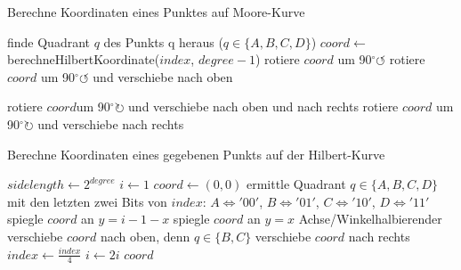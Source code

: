 \documentclass[course=erap]{aspdoc}
\begin{document}
\begin{algorithm}[h]
\scriptsize
\begin{algorithmic}
\caption{Berechne Koordinaten eines Punktes auf Moore-Kurve}
\label{moore:iterative}
	\State finde Quadrant $q$ des Punkts q heraus ($q \in \{A, B, C, D\}$)
	\State $coord \leftarrow$ berechneHilbertKoordinate($index$, $degree-1$)
	 rotiere $coord$ um 90$^{\circ} \circlearrowleft$
	 rotiere $coord$ um 90$^{\circ}\circlearrowleft$ und verschiebe nach oben
		
	 rotiere $coord$um 90$^{\circ}\circlearrowright$ und verschiebe nach oben und nach rechts
	 rotiere $coord$ um  90$^{\circ} \circlearrowright$ und verschiebe nach rechts
	\EndIf
\EndFunction
{}
	\State [...]
\EndFunction
\end{algorithmic}
\end{algorithm}

\begin{algorithm}[h]
\scriptsize
\begin{algorithmic}
\caption{Berechne Koordinaten eines gegebenen Punkts auf der Hilbert-Kurve}
\label{hilbert:iterative}
	\State $sidelength \leftarrow 2^{degree}$
	\State $i \leftarrow 1$
	\State $coord \leftarrow (0, 0)$
		\State ermittle Quadrant $q \in \{A, B, C, D\}$ mit den letzten zwei Bits von $index$:
		\State $A \iff '00'$, $B \iff '01'$, $C \iff '10'$, $D \iff '11'$
			\State spiegle $coord$ an $y = i-1-x$ 
			\Else 
			\State spiegle $coord$ an $y=x$ Achse/Winkelhalbierender
			\EndIf
		\Else 
		\State verschiebe $coord$ nach oben, denn $q \in \{B, C\}$
		\EndIf
		\State verschiebe $coord$ nach rechts
		\EndIf
		\State $index \leftarrow \frac{index}{4}$ 
		\State $i \leftarrow 2i$
	\EndWhile
	\State \Return $coord$
\EndFunction
\end{algorithmic}
\end{algorithm}
\end{document}
